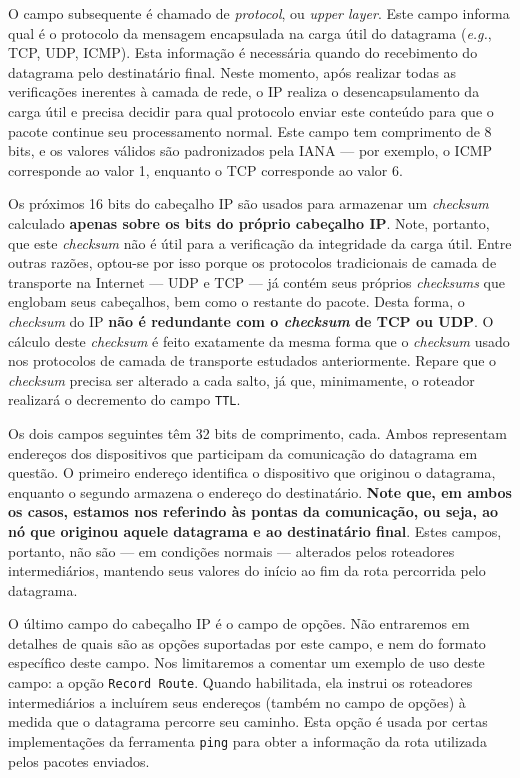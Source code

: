 \documentclass{article}
\begin{document}
O campo subsequente é chamado de \textit{protocol}, ou \textit{upper layer}. Este campo informa qual é o protocolo da mensagem encapsulada na carga útil do datagrama (\textit{e.g.}, TCP, UDP, ICMP). Esta informação é necessária quando do recebimento do datagrama pelo destinatário final. Neste momento, após realizar todas as verificações inerentes à camada de rede, o IP realiza o desencapsulamento da carga útil e precisa decidir para qual protocolo enviar este conteúdo para que o pacote continue seu processamento normal. Este campo tem comprimento de 8 bits, e os valores válidos são padronizados pela IANA --- por exemplo, o ICMP corresponde ao valor 1, enquanto o TCP corresponde ao valor 6.

Os próximos 16 bits do cabeçalho IP são usados para armazenar um \textit{checksum} calculado \textbf{apenas sobre os bits do próprio cabeçalho IP}. Note, portanto, que este \textit{checksum} não é útil para a verificação da integridade da carga útil. Entre outras razões, optou-se por isso porque os protocolos tradicionais de camada de transporte na Internet --- UDP e TCP --- já contém seus próprios \textit{checksums} que englobam seus cabeçalhos, bem como o restante do pacote. Desta forma, o \textit{checksum} do IP \textbf{não é redundante com o \textit{checksum} de TCP ou UDP}. O cálculo deste \textit{checksum} é feito exatamente da mesma forma que o \textit{checksum} usado nos protocolos de camada de transporte estudados anteriormente. Repare que o \textit{checksum} precisa ser alterado a cada salto, já que, minimamente, o roteador realizará o decremento do campo \texttt{TTL}.

Os dois campos seguintes têm 32 bits de comprimento, cada. Ambos representam endereços dos dispositivos que participam da comunicação do datagrama em questão. O primeiro endereço identifica o dispositivo que originou o datagrama, enquanto o segundo armazena o endereço do destinatário. \textbf{Note que, em ambos os casos, estamos nos referindo às pontas da comunicação, ou seja, ao nó que originou aquele datagrama e ao destinatário final}. Estes campos, portanto, não são --- em condições normais --- alterados pelos roteadores intermediários, mantendo seus valores do início ao fim da rota percorrida pelo datagrama.

O último campo do cabeçalho IP é o campo de opções. Não entraremos em detalhes de quais são as opções suportadas por este campo, e nem do formato específico deste campo. Nos limitaremos a comentar um exemplo de uso deste campo: a opção \texttt{Record Route}. Quando habilitada, ela instrui os roteadores intermediários a incluírem seus endereços (também no campo de opções) à medida que o datagrama percorre seu caminho. Esta opção é usada por certas implementações da ferramenta \texttt{ping} para obter a informação da rota utilizada pelos pacotes enviados. 
\end{document}
